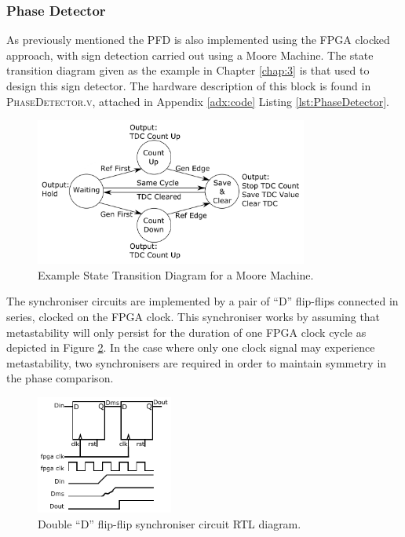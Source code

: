 \subsubsection{Phase Detector}
As previously mentioned the \ac{PFD} is also implemented using the \ac{FPGA} clocked approach, with sign detection carried out using a Moore Machine. The state transition diagram given as the example in Chapter \ref{chap:3} is that used to design this sign detector. The hardware description of this block is found in \textsc{PhaseDetector.v}, attached in Appendix \ref{adx:code} Listing \ref{lst:PhaseDetector}.
\begin{figure}[h]
	\centering
	\includegraphics[width=0.8\textwidth]{../state_trans_new}
	\caption[Example State Transition Diagram for a Moore Machine]{Example State Transition Diagram for a Moore Machine.}
	\label{fig:state_trans_reprint}
\end{figure}

The synchroniser circuits are implemented by a pair of ``D'' flip-flips connected in series, clocked on the \ac{FPGA} clock. This synchroniser works by assuming that metastability will only persist for the duration of one \ac{FPGA} clock cycle as depicted in Figure \ref{fig:synchroniser_behav}. In the case where only one clock signal may experience metastability, two synchronisers are required in order to maintain symmetry in the phase comparison.
\begin{figure}[h]
\centering
\includegraphics[width=0.4\textwidth]{../synchroniser_behav}
\caption[Double ``D'' flip-flip synchroniser circuit \ac{RTL} diagram]{Double ``D'' flip-flip synchroniser circuit \ac{RTL} diagram.}
\label{fig:synchroniser_behav}
\end{figure}

